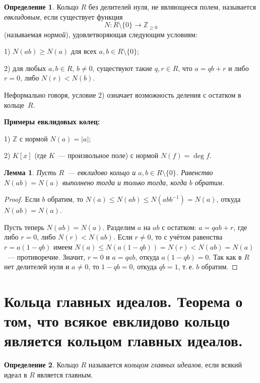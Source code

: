 \documentclass[a4paper, 12pt]{article}
\def\ZZ{{\mathbb Z}}%
\newtheorem{lemma}{Лемма}
\theoremstyle{definition}
\newtheorem{definition}{Определение}
\theoremstyle{remark}
\begin{document}
\begin{definition}
Кольцо $R$ без делителей нуля, не являющееся полем, называется {\it
евклидовым}, если существует функция
$$
N\colon R\setminus\{0\} \to \ZZ_{\geqslant 0}
$$
(называемая {\it нормой}), удовлетворяющая следующим условиям:

1) $N(ab) \geqslant N(a)$ для всех $a, b \in R \setminus \{0\}$;

2) для любых $a, b \in R$, $b \ne 0$, существуют такие $q,r\in R$,
что $a = qb + r$ и либо $r = 0$, либо $N(r) < N(b)$.
\end{definition}

Неформально говоря, условие 2) означает возможность \guillemotleft
деления с остатком\guillemotright{} в кольце~$R$.

\textbf{Примеры евклидовых колец:}

1) $\ZZ$ с нормой $N(a) = |a|$;

2) $K[x]$ (где $K$~--- произвольное поле) с нормой $N(f) = \deg f$.

\begin{lemma} \label{lemma_first}
Пусть $R$~--- евклидово кольцо и $a,b \in R \setminus \lbrace 0
\rbrace$. Равенство $N(ab) = N(a)$ выполнено тогда и только тогда,
когда $b$ обратим.
\end{lemma}

\begin{proof}
Если $b$ обратим, то $N(a)\leqslant N(ab)\leqslant
N(abb^{-1})=N(a)$, откуда $N(ab)=N(a)$.

Пусть теперь $N(ab) = N(a)$. Разделим $a$ на $ab$ с остатком: $a =
qab + r$, где либо $r = 0$, либо $N(r) < N(ab)$. Если $r \ne 0$, то
с учётом равенства $r = a(1-qb)$ имеем $N(a) \leqslant N(a(1-qb)) =
N(r) < N(ab) = N(a)$~--- противоречие. Значит, $r = 0$ и $a = qab$,
откуда $a(1 - qb) = 0$. Так как в $R$ нет делителей нуля и $a \ne
0$, то $1 - qb = 0$, откуда $qb = 1$, т.\,е. $b$ обратим.
\end{proof}


\section{Кольца главных идеалов. Теорема о том, что всякое евклидово кольцо является кольцом главных идеалов.}

\begin{definition}
Кольцо $R$ называется \textit{кольцом главных идеалов}, если всякий
идеал в $R$ является главным.
\end{definition}
\end{document}

